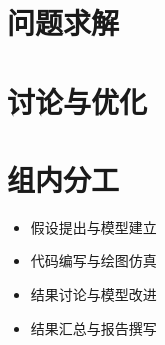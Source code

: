 \documentclass{article}
\begin{document}
	\section{问题求解}
	
	\section{讨论与优化}
	
	\section{组内分工}
	\begin{itemize}
		\item 假设提出与模型建立
		\item 代码编写与绘图仿真
		\item 结果讨论与模型改进
		\item 结果汇总与报告撰写
	\end{itemize}
	
%	
	
\end{document}
